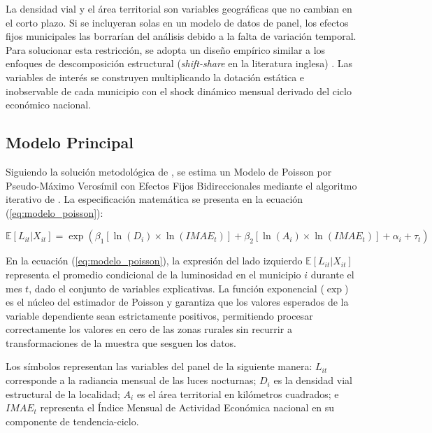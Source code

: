 \documentclass[
  spanish,
  12pt,
  letterpaper]{article}
\begin{document}
La densidad vial y el área territorial son variables geográficas que no
cambian en el corto plazo. Si se incluyeran solas en un modelo de datos
de panel, los efectos fijos municipales las borrarían del análisis
debido a la falta de variación temporal. Para solucionar esta
restricción, se adopta un diseño empírico similar a los enfoques de
descomposición estructural (\emph{shift-share} en la literatura inglesa)
\parencite{borusyak2022quasi}. Las variables de interés se construyen
multiplicando la dotación estática e inobservable de cada municipio con
el shock dinámico mensual derivado del ciclo económico nacional.

\subsection{Modelo Principal}\label{modelo-principal}

Siguiendo la solución metodológica de \textcite{silva2006log}, se estima
un Modelo de Poisson por Pseudo-Máximo Verosímil con Efectos Fijos
Bidireccionales mediante el algoritmo iterativo de
\textcite{correia2020fast}. La especificación matemática se presenta en
la ecuación (\ref{eq:modelo_poisson}):

\begin{equation}
\label{eq:modelo_poisson}
\mathbb{E}[L_{it} | X_{it}] = \exp \left( \beta_1 [\ln(D_i) \times \ln(IMAE_t)] + \beta_2 [\ln(A_i) \times \ln(IMAE_t)] + \alpha_i + \tau_t \right)
\end{equation}

En la ecuación (\ref{eq:modelo_poisson}), la expresión del lado
izquierdo \(\mathbb{E}[L_{it} | X_{it}]\) representa el promedio
condicional de la luminosidad en el municipio \(i\) durante el mes
\(t\), dado el conjunto de variables explicativas. La función
exponencial (\(\exp\)) es el núcleo del estimador de Poisson y garantiza
que los valores esperados de la variable dependiente sean estrictamente
positivos, permitiendo procesar correctamente los valores en cero de las
zonas rurales sin recurrir a transformaciones de la muestra que sesguen
los datos.

Los símbolos representan las variables del panel de la siguiente manera:
\(L_{it}\) corresponde a la radiancia mensual de las luces nocturnas;
\(D_i\) es la densidad vial estructural de la localidad; \(A_i\) es el
área territorial en kilómetros cuadrados; e \(IMAE_t\) representa el
Índice Mensual de Actividad Económica nacional en su componente de
tendencia-ciclo.
\end{document}
